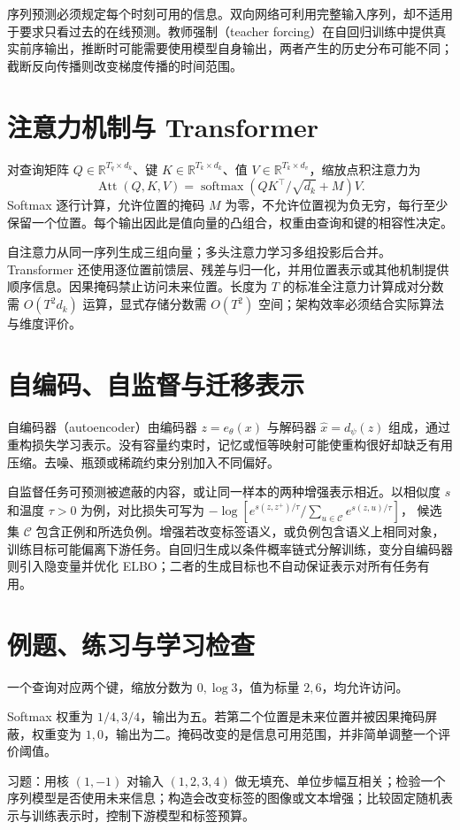 序列预测必须规定每个时刻可用的信息。双向网络可利用完整输入序列，却不适用于要求只看过去的在线预测。教师强制（teacher forcing）在自回归训练中提供真实前序输出，推断时可能需要使用模型自身输出，两者产生的历史分布可能不同；截断反向传播则改变梯度传播的时间范围。

\section{注意力机制与 Transformer}

对查询矩阵 $Q\in\mathbb R^{T_q\times d_k}$、键 $K\in\mathbb R^{T_k\times d_k}$、值 $V\in\mathbb R^{T_k\times d_v}$，缩放点积注意力为
\begin{equation}
 \operatorname{Att}(Q,K,V)=
 \operatorname{softmax}(QK^\top/\sqrt{d_k}+M)V.
 \label{eq:ml-attention}
\end{equation}
Softmax 逐行计算，允许位置的掩码 $M$ 为零，不允许位置视为负无穷，每行至少保留一个位置。每个输出因此是值向量的凸组合，权重由查询和键的相容性决定。

自注意力从同一序列生成三组向量；多头注意力学习多组投影后合并。Transformer 还使用逐位置前馈层、残差与归一化，并用位置表示或其他机制提供顺序信息。因果掩码禁止访问未来位置。长度为 $T$ 的标准全注意力计算成对分数需 $O(T^2d_k)$ 运算，显式存储分数需 $O(T^2)$ 空间；架构效率必须结合实际算法与维度评价。

\section{自编码、自监督与迁移表示}

自编码器（autoencoder）由编码器 $z=e_\theta(x)$ 与解码器 $\widehat x=d_\psi(z)$ 组成，通过重构损失学习表示。没有容量约束时，记忆或恒等映射可能使重构很好却缺乏有用压缩。去噪、瓶颈或稀疏约束分别加入不同偏好。

自监督任务可预测被遮蔽的内容，或让同一样本的两种增强表示相近。以相似度 $s$ 和温度 $\tau>0$ 为例，对比损失可写为
$-\log[e^{s(z,z^+)/\tau}/\sum_{u\in\mathcal C}e^{s(z,u)/\tau}]$，
候选集 $\mathcal C$ 包含正例和所选负例。增强若改变标签语义，或负例包含语义上相同对象，训练目标可能偏离下游任务。自回归生成以条件概率链式分解训练，变分自编码器则引入隐变量并优化 ELBO；二者的生成目标也不自动保证表示对所有任务有用。

\section{例题、练习与学习检查}

\begin{example}[注意力的加权平均]
一个查询对应两个键，缩放分数为 $0,\log3$，值为标量 $2,6$，均允许访问。
\end{example}
\begin{solve}
Softmax 权重为 $1/4,3/4$，输出为五。若第二个位置是未来位置并被因果掩码屏蔽，权重变为 $1,0$，输出为二。掩码改变的是信息可用范围，并非简单调整一个评价阈值。
\end{solve}

习题：用核 $(1,-1)$ 对输入 $(1,2,3,4)$ 做无填充、单位步幅互相关；检验一个序列模型是否使用未来信息；构造会改变标签的图像或文本增强；比较固定随机表示与训练表示时，控制下游模型和标签预算。




